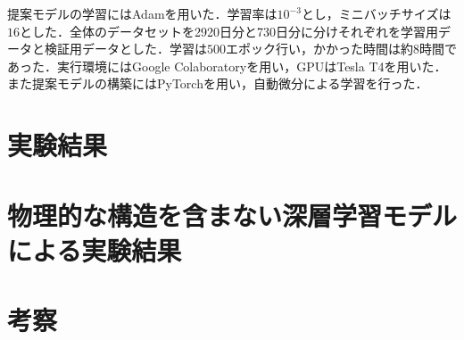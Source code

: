
提案モデルの学習にはAdam\cite{Kingma2014AdamAM}を用いた．学習率は$10^{-3}$とし，ミニバッチサイズは$16$とした．全体のデータセットを2920日分と730日分に分けそれぞれを学習用データと検証用データとした．学習は$500$エポック行い，かかった時間は約8時間であった．実行環境にはGoogle Colaboratory\cite{GoogleColaboratory}を用い，GPUはTesla T4を用いた．また提案モデルの構築にはPyTorch\cite{NEURIPS2019-9015}を用い，自動微分による学習を行った．

% 

\section{実験結果 \label{section:exp-results}}

\section{物理的な構造を含まない深層学習モデルによる実験結果 \label{section:exp-results-without-physicial-structure}}

\section{考察 \label{section:exp-discussion}}
